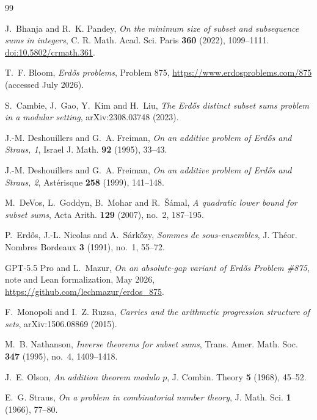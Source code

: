 \documentclass[11pt]{article}
\theoremstyle{definition}
\theoremstyle{remark}
\begin{document}
\begin{thebibliography}{99}

J.~Bhanja and R.~K. Pandey,
\emph{On the minimum size of subset and subsequence sums in integers},
C. R. Math. Acad. Sci. Paris \textbf{360} (2022), 1099--1111.
\href{https://doi.org/10.5802/crmath.361}{doi:10.5802/crmath.361}.

T.~F. Bloom, \emph{Erd\H{o}s problems}, Problem 875,
\url{https://www.erdosproblems.com/875} (accessed July 2026).

S.~Cambie, J.~Gao, Y.~Kim and H.~Liu,
\emph{The Erd\H{o}s distinct subset sums problem in a modular setting},
arXiv:2308.03748 (2023).

J.-M. Deshouillers and G.~A. Freiman,
\emph{On an additive problem of Erd\H{o}s and Straus, 1},
Israel J. Math. \textbf{92} (1995), 33--43.

J.-M. Deshouillers and G.~A. Freiman,
\emph{On an additive problem of Erd\H{o}s and Straus, 2},
Ast\'erisque \textbf{258} (1999), 141--148.

M.~DeVos, L.~Goddyn, B.~Mohar and R.~\v{S}\'amal,
\emph{A quadratic lower bound for subset sums},
Acta Arith. \textbf{129} (2007), no.~2, 187--195.

P.~Erd\H{o}s, J.-L. Nicolas and A.~S\'ark\H{o}zy,
\emph{Sommes de sous-ensembles},
J. Th\'eor. Nombres Bordeaux \textbf{3} (1991), no.~1, 55--72.

GPT-5.5 Pro and L.~Mazur,
\emph{On an absolute-gap variant of Erd\H{o}s Problem \#875},
note and Lean formalization, May 2026,
\url{https://github.com/lechmazur/erdos_875}.

F.~Monopoli and I.~Z. Ruzsa,
\emph{Carries and the arithmetic progression structure of sets},
arXiv:1506.08869 (2015).

M.~B. Nathanson,
\emph{Inverse theorems for subset sums},
Trans. Amer. Math. Soc. \textbf{347} (1995), no.~4, 1409--1418.

J.~E. Olson,
\emph{An addition theorem modulo $p$},
J. Combin. Theory \textbf{5} (1968), 45--52.

E.~G. Straus,
\emph{On a problem in combinatorial number theory},
J. Math. Sci. \textbf{1} (1966), 77--80.

\end{thebibliography}
\end{document}
